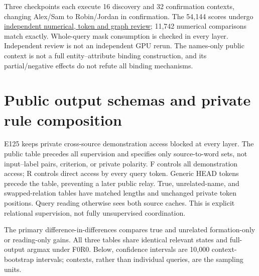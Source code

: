 \documentclass[11pt]{article}
\begin{document}
Three checkpoints each execute 16 discovery and 32 confirmation contexts, changing Alex/Sam to Robin/Jordan in confirmation. The 54,144 scores undergo \href{results/e124/independent_review_2026-10-12.md}{independent numerical, token and graph review}; 11,742 numerical comparisons match exactly. Whole-query mask consumption is checked in every layer. Independent review is not an independent GPU rerun. The names-only public context is not a full entity--attribute binding construction, and its partial/negative effects do not refute all binding mechanisms.

\section{Public output schemas and private rule composition}\label{public-output-schemas-and-private-rule-composition}

E125 keeps private cross-source demonstration access blocked at every layer. The public table precedes all supervision and specifies only source-to-word sets, not input--label pairs, criterion, or private polarity. F controls all demonstration access; R controls direct access by every query token. Generic HEAD tokens precede the table, preventing a later public relay. True, unrelated-name, and swapped-relation tables have matched lengths and unchanged private token positions. Query reading otherwise sees both source caches. This is explicit relational supervision, not fully unsupervised coordination.

The primary difference-in-differences compares true and unrelated formation-only or reading-only gains. All three tables share identical relevant states and full-output argmax under F0R0. Below, confidence intervals are 10,000 context-bootstrap intervals; contexts, rather than individual queries, are the sampling units.
\end{document}
